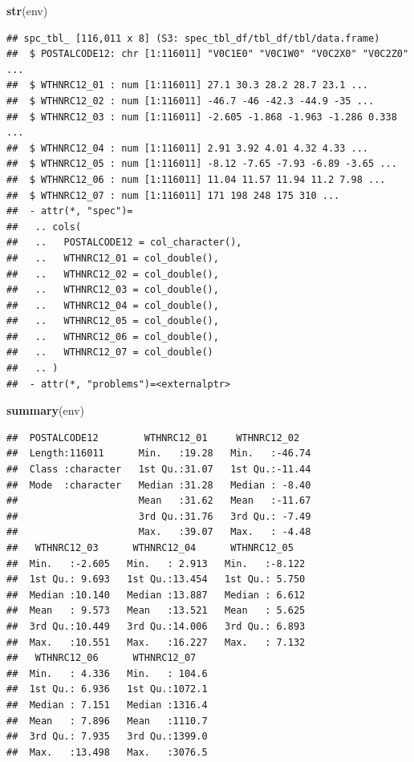 \documentclass[
  11pt,
  oneside]{book}
\newenvironment{Shaded}{\begin{snugshade}}{\end{snugshade}}
\newcommand{\FunctionTok}[1]{\textcolor[rgb]{0.13,0.29,0.53}{\textbf{#1}}}
\newcommand{\NormalTok}[1]{#1}
\begin{document}
\begin{Shaded}
\begin{Highlighting}[]
\FunctionTok{str}\NormalTok{(env)}
\end{Highlighting}
\end{Shaded}

\begin{verbatim}
## spc_tbl_ [116,011 x 8] (S3: spec_tbl_df/tbl_df/tbl/data.frame)
##  $ POSTALCODE12: chr [1:116011] "V0C1E0" "V0C1W0" "V0C2X0" "V0C2Z0" ...
##  $ WTHNRC12_01 : num [1:116011] 27.1 30.3 28.2 28.7 23.1 ...
##  $ WTHNRC12_02 : num [1:116011] -46.7 -46 -42.3 -44.9 -35 ...
##  $ WTHNRC12_03 : num [1:116011] -2.605 -1.868 -1.963 -1.286 0.338 ...
##  $ WTHNRC12_04 : num [1:116011] 2.91 3.92 4.01 4.32 4.33 ...
##  $ WTHNRC12_05 : num [1:116011] -8.12 -7.65 -7.93 -6.89 -3.65 ...
##  $ WTHNRC12_06 : num [1:116011] 11.04 11.57 11.94 11.2 7.98 ...
##  $ WTHNRC12_07 : num [1:116011] 171 198 248 175 310 ...
##  - attr(*, "spec")=
##   .. cols(
##   ..   POSTALCODE12 = col_character(),
##   ..   WTHNRC12_01 = col_double(),
##   ..   WTHNRC12_02 = col_double(),
##   ..   WTHNRC12_03 = col_double(),
##   ..   WTHNRC12_04 = col_double(),
##   ..   WTHNRC12_05 = col_double(),
##   ..   WTHNRC12_06 = col_double(),
##   ..   WTHNRC12_07 = col_double()
##   .. )
##  - attr(*, "problems")=<externalptr>
\end{verbatim}

\begin{Shaded}
\begin{Highlighting}[]
\FunctionTok{summary}\NormalTok{(env)}
\end{Highlighting}
\end{Shaded}

\begin{verbatim}
##  POSTALCODE12        WTHNRC12_01     WTHNRC12_02    
##  Length:116011      Min.   :19.28   Min.   :-46.74  
##  Class :character   1st Qu.:31.07   1st Qu.:-11.44  
##  Mode  :character   Median :31.28   Median : -8.40  
##                     Mean   :31.62   Mean   :-11.67  
##                     3rd Qu.:31.76   3rd Qu.: -7.49  
##                     Max.   :39.07   Max.   : -4.48  
##   WTHNRC12_03      WTHNRC12_04      WTHNRC12_05    
##  Min.   :-2.605   Min.   : 2.913   Min.   :-8.122  
##  1st Qu.: 9.693   1st Qu.:13.454   1st Qu.: 5.750  
##  Median :10.140   Median :13.887   Median : 6.612  
##  Mean   : 9.573   Mean   :13.521   Mean   : 5.625  
##  3rd Qu.:10.449   3rd Qu.:14.006   3rd Qu.: 6.893  
##  Max.   :10.551   Max.   :16.227   Max.   : 7.132  
##   WTHNRC12_06      WTHNRC12_07    
##  Min.   : 4.336   Min.   : 104.6  
##  1st Qu.: 6.936   1st Qu.:1072.1  
##  Median : 7.151   Median :1316.4  
##  Mean   : 7.896   Mean   :1110.7  
##  3rd Qu.: 7.935   3rd Qu.:1399.0  
##  Max.   :13.498   Max.   :3076.5
\end{verbatim}
\end{document}
